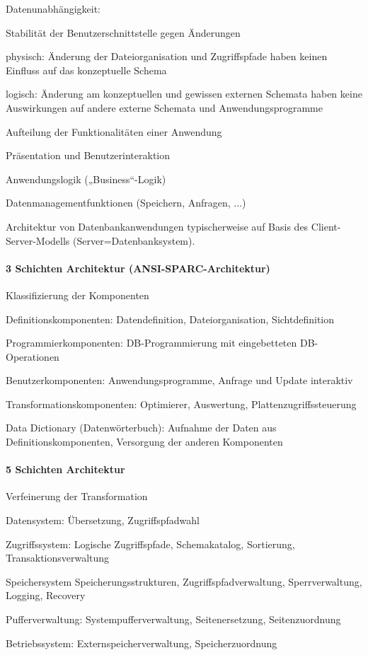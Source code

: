 \documentclass[a4paper]{article}
\begin{document}
\begin{multicols}{3}
Datenunabhängigkeit:
\begin{itemize*}
    \item Stabilität der Benutzerschnittstelle gegen Änderungen
    \item physisch: Änderung der Dateiorganisation und Zugriffspfade haben keinen Einfluss auf das konzeptuelle Schema
    \item logisch: Änderung am konzeptuellen und gewissen externen Schemata haben keine Auswirkungen auf andere externe Schemata und Anwendungsprogramme
\end{itemize*}

Aufteilung der Funktionalitäten einer Anwendung
\begin{itemize*}
    \item Präsentation und Benutzerinteraktion
    \item Anwendungslogik („Business“-Logik)
    \item Datenmanagementfunktionen (Speichern, Anfragen, ...)
\end{itemize*}

Architektur von Datenbankanwendungen typischerweise auf Basis des Client-Server-Modells (Server=Datenbanksystem).

\paragraph{3 Schichten Architektur (ANSI-SPARC-Architektur) }
Klassifizierung der Komponenten
\begin{itemize*}
    \item Definitionskomponenten: Datendefinition, Dateiorganisation, Sichtdefinition
    \item Programmierkomponenten: DB-Programmierung mit eingebetteten DB-Operationen
    \item Benutzerkomponenten: Anwendungsprogramme, Anfrage und Update interaktiv
    \item Transformationskomponenten: Optimierer, Auswertung, Plattenzugriffssteuerung
    \item Data Dictionary (Datenwörterbuch): Aufnahme der Daten aus Definitionskomponenten, Versorgung der anderen Komponenten
\end{itemize*}

\paragraph{5 Schichten Architektur}
Verfeinerung der Transformation
\begin{itemize*}
    \item Datensystem: Übersetzung, Zugriffspfadwahl
    \item Zugriffssystem: Logische Zugriffspfade, Schemakatalog, Sortierung, Transaktionsverwaltung
    \item Speichersystem Speicherungsstrukturen, Zugriffspfadverwaltung, Sperrverwaltung, Logging, Recovery
    \item Pufferverwaltung: Systempufferverwaltung, Seitenersetzung, Seitenzuordnung
    \item Betriebssystem: Externspeicherverwaltung, Speicherzuordnung
\end{itemize*}


\end{multicols}
\end{document}
